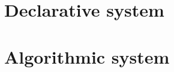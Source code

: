 \documentclass[a4,natbib=false]{article}
\begin{document}
\section{Declarative system}
\ottgrammartabular{
\otte\ottinterrule
\ottX\ottinterrule
}
\ottdefnsDe

\newpage
\section{Algorithmic system}
\ottgrammartabular{
  \ottue\ottinterrule
  \ottuA\ottinterrule
}
\ottdefnsAl{}



\end{document}
